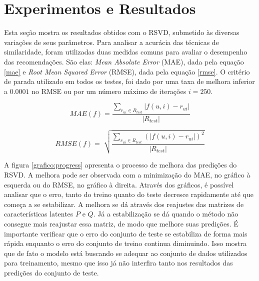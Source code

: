\documentclass[12pt]{article}
\begin{document}



\section{Experimentos e Resultados}

Esta seção mostra os resultados obtidos com o RSVD, submetido às diversas variações de seus parâmetros. Para analisar a acurácia das técnicas de similaridade, foram utilizadas duas medidas comuns para avaliar o desempenho das recomendações. São elas: \textit{Mean Absolute Error} (MAE), dada pela equação \ref{mae} e \textit{Root Mean Squared Error} (RMSE), dada pela equação \ref{rmse}. O critério de parada utilizado em todos os testes, foi dado por uma taxa de melhora inferior a $0.0001$ no RMSE ou por um número máximo de iterações $i = 250$.

\begin{equation} \label{mae}
MAE(f) = \frac{\sum\limits_{r_{ui} \in R_{test}} |f(u,i) - r_{ui}|}{|R_{test}|}
\end{equation}

\begin{equation} \label{rmse}
RMSE(f) = \sqrt[]{\frac{\sum\limits_{r_{ui} \in R_{test}} (|f(u,i) - r_{ui}|)^2}{|R_{test}|}}
\end{equation}

A figura \ref{grafico:progress} apresenta o processo de melhora das predições do RSVD. A melhora pode ser observada com a minimização do MAE, no gráfico à esquerda ou do RMSE, no gráfico à direita. Através dos gráficos, é possível analisar que o erro, tanto do treino quanto do teste decresce rapidamente até que começa a se estabilizar. A melhora se dá através dos reajustes das matrizes de características latentes  $P$ e $Q$. Já a estabilização se dá quando o método não consegue mais reajustar essa matriz, de modo que melhore suas predições. É importante verificar que o erro do conjunto de teste se estabiliza de forma mais rápida enquanto o erro do conjunto de treino continua diminuindo. Isso mostra que de fato o modelo está buscando se adequar ao conjunto de dados utilizados para treinamento, mesmo que isso já não interfira tanto nos resultados das predições do conjunto de teste.
\end{document}
